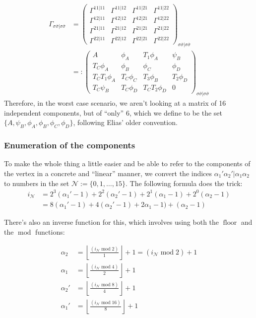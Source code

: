 \documentclass[12pt,a4paper,roman]{article}
\begin{document}
\begin{align}
\Gamma_{\sigma\overline{\sigma}|\sigma\overline{\sigma}} &=
    \begin{pmatrix}
    \Gamma^{11|11} & \Gamma^{11|12} & \Gamma^{11|21} & \Gamma^{11|22} \\
    \Gamma^{12|11} & \Gamma^{12|12} & \Gamma^{12|21} & \Gamma^{12|22} \\
    \Gamma^{21|11} & \Gamma^{21|12} & \Gamma^{21|21} & \Gamma^{21|22} \\
    \Gamma^{22|11} & \Gamma^{22|12} & \Gamma^{22|21} & \Gamma^{22|22}
    \end{pmatrix}_{\sigma\overline{\sigma}|\sigma\overline{\sigma}} \\
    & = :     \begin{pmatrix}
    A & \phi_A & T_1\phi_A & \psi_B \\
    T_C\phi_A & \phi_B & \phi_C & \phi_D \\
    T_C T_1\phi_A & T_C \phi_C & T_3\phi_B & T_2\phi_D \\
    T_C\psi_B & T_C\phi_D & T_CT_2\phi_D & 0
    \end{pmatrix}_{\sigma\overline{\sigma}|\sigma\overline{\sigma}}
\end{align}
Therefore, in the worst case scenario, we aren't looking at a matrix of 16 independent components, but of ``only'' 6, which we define to be the set $\{A, \psi_B, \phi_A, \phi_B, \phi_C, \phi_D\}$, following Elias' older convention.

\subsubsection*{Enumeration of the components}
To make the whole thing a little easier and be able to refer to the components of the vertex in a concrete and ``linear'' manner, we convert the indices $\alpha_1'\alpha_2'|\alpha_1\alpha_2$ to numbers in the set $\mathcal{N} := \{0, 1, \dots, 15\}$. The following formula does the trick:
\begin{align}
    i_\mathcal{N} &= 2^3(\alpha_1'-1)+2^2(\alpha_2'-1)+2^1(\alpha_1-1)+2^0(\alpha_2-1)\\
        &= 8(\alpha_1'-1)+4(\alpha_2'-1)+2\alpha_1-1)+(\alpha_2-1)
\end{align}

There's also an inverse function for this, which involves using both the $\operatorname{floor}$
and the $\operatorname{mod}$ functions:

\begin{align}
    \alpha_2 &= \left\lfloor{\frac{(i_\mathcal{N}\operatorname{mod}2)}{1}  }\right\rfloor +1 =(i_\mathcal{N}\operatorname{mod}2) +1\\
    \alpha_1 &= \left\lfloor{\frac{(i_\mathcal{N}\operatorname{mod}4)}{2}  }\right\rfloor +1 \\
    \alpha_2' &= \left\lfloor{\frac{(i_\mathcal{N}\operatorname{mod}8)}{4}  }\right\rfloor +1 \\
    \alpha_1' &= \left\lfloor{\frac{(i_\mathcal{N}\operatorname{mod}16)}{8}  }\right\rfloor +1 
\end{align}
\end{document}
